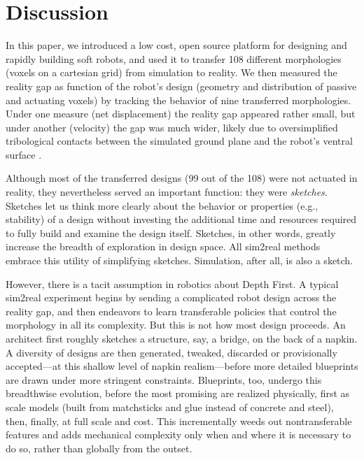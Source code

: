 \section{Discussion}
\label{sec:discussion}


In this paper, we introduced a low cost, open source platform for designing and rapidly building soft robots, and used it to transfer 
108 different morphologies (voxels on a cartesian grid) from simulation to reality.
We then measured the reality gap as function of the robot's design (geometry and distribution of passive and actuating voxels) by tracking the behavior of nine transferred morphologies.
Under one measure (net displacement) the reality gap appeared rather small, but under another (velocity) the gap was much wider, likely due to oversimplified tribological contacts between the simulated ground plane and the robot's ventral surface \cite{majidi2013influence}.

Although most of the transferred designs (99 out of the 108) were not actuated in reality, they nevertheless served an important function:
they were \textit{sketches}.
Sketches let us think more clearly about the behavior or properties (e.g., stability) of a design without investing the additional time and resources required to fully build and examine the design itself.
Sketches, in other words, greatly increase the breadth of exploration in design space.
All sim2real methods embrace this utility of simplifying sketches.
Simulation, after all, is also a sketch.

However, there is a tacit assumption in robotics about Depth First.
A typical sim2real experiment begins by sending a
complicated robot design across the reality gap,
and then endeavors to learn transferable policies that control the morphology in all its complexity.
But this is not how most design proceeds.
An architect first roughly sketches a structure, say, a bridge, on the back of a napkin.
A diversity of designs are then generated, tweaked, discarded or provisionally accepted---at this shallow level of napkin realism---before more detailed blueprints are drawn under more stringent constraints.
Blueprints, too, undergo this breadthwise evolution, before the most promising are realized physically, first as scale models (built from matchsticks and glue instead of concrete and steel), then, finally, at full scale and cost.
This incrementally weeds out nontransferable features and adds mechanical complexity only when and where it is necessary to do so, rather than globally from the outset.

